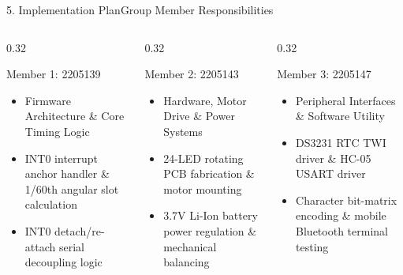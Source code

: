 \documentclass[aspectratio=169, 10pt]{beamer}
\begin{document}
\begin{frame}{5. Implementation Plan}{Group Member Responsibilities}
    \begin{columns}[T]
        \begin{column}{0.32\textwidth}
            \begin{block}{Member 1: 2205139}
                \small
                \begin{itemize}
                    \item Firmware Architecture \& Core Timing Logic
                    \item INT0 interrupt anchor handler \& 1/60th angular slot calculation
                    \item INT0 detach/re-attach serial decoupling logic
                \end{itemize}
            \end{block}
        \end{column}
        \begin{column}{0.32\textwidth}
            \begin{block}{Member 2: 2205143}
                \small
                \begin{itemize}
                    \item Hardware, Motor Drive \& Power Systems
                    \item 24-LED rotating PCB fabrication \& motor mounting
                    \item 3.7V Li-Ion battery power regulation \& mechanical balancing
                \end{itemize}
            \end{block}
        \end{column}
        \begin{column}{0.32\textwidth}
            \begin{block}{Member 3: 2205147}
                \small
                \begin{itemize}
                    \item Peripheral Interfaces \& Software Utility
                    \item DS3231 RTC TWI driver \& HC-05 USART driver
                    \item Character bit-matrix encoding \& mobile Bluetooth terminal testing
                \end{itemize}
            \end{block}
        \end{column}
    \end{columns}
\end{frame}
\end{document}
